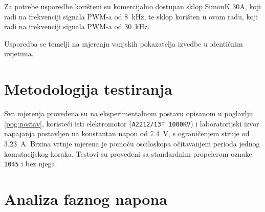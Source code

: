 \documentclass[diplomskirad]{fer}
\begin{document}
Za potrebe usporedbe korišteni su komercijalno dostupan sklop SimonK 30A, koji
radi na frekvenciji signala PWM-a od \SI{8}{\kilo\hertz}, te sklop korišten u
ovom radu, koji radi na frekvenciji signala PWM-a od \SI{30}{\kilo\hertz}.

Usporedba se temelji na mjerenju vanjskih pokazatelja izvedbe u identičnim
uvjetima.

\section{Metodologija testiranja}
\label{sec:metodologija_testiranja}

Sva mjerenja provedena su na eksperimentalnom postavu opisanom u poglavlju
\ref{pog:postav}, koristeći isti elektromotor (\texttt{A2212/13T 1000KV}) i
laboratorijski izvor napajanja postavljen na konstantan napon od
\SI{7.4}{\volt}, s ograničenjem struje od \SI{3.23}{\ampere}. Brzina vrtnje
mjerena je pomoću osciloskopa očitavanjem perioda jednog komutacijskog koraka.
Testovi su provedeni sa standardnim propelerom oznake \texttt{1045} i bez
njega.

\section{Analiza faznog napona}
\label{sec:analiza_napona}
\end{document}
